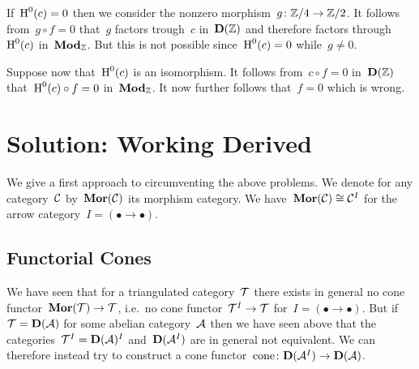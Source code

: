 \documentclass[a4paper,10pt]{scrartcl}
\begin{document}
If~$\operatorname{H}^0(c) = 0$ then we consider the nonzero morphism~$g \colon \mathbb{Z}/4 \to \mathbb{Z}/2$.
It follows from~$g \circ f = 0$ that~$g$ factors trough~$c$ in~$\mathbf{D}(\mathbb{Z})$ and therefore factors through~$\operatorname{H}^0(c)$ in~$\mathbf{Mod}_{\mathbb{Z}}$.
But this is not possible since~$\operatorname{H}^0(c) = 0$ while~$g \neq 0$.

Suppose now that~$\operatorname{H}^0(c)$ is an isomorphism.
It follows from~$c \circ f = 0$ in~$\mathbf{D}(\mathbb{Z})$ that~$\operatorname{H}^0(c) \circ f = 0$ in~$\mathbf{Mod}_{\mathbb{Z}}$.
It now further follows that~$f = 0$ which is wrong.





\section{Solution: Working Derived}

We give a first approach to circumventing the above problems.
We denote for any category~$\mathcal{C}$ by~$\mathbf{Mor}(\mathcal{C})$ its morphism category.
We have~$\mathbf{Mor}(\mathcal{C}) \cong \mathcal{C}^I$ for the arrow category~$I = (\bullet \to \bullet)$.



\subsection{Functorial Cones}

We have seen that for a triangulated category~$\mathcal{T}$ there exists in general no cone functor~$\mathbf{Mor}(\mathcal{T}) \to \mathcal{T}$, i.e.\ no cone functor~$\mathcal{T}^I \to \mathcal{T}$ for~$I = (\bullet \to \bullet)$.
But if~$\mathcal{T} = \mathbf{D}(\mathcal{A})$ for some abelian category~$\mathcal{A}$ then we have seen above that the categories~$\mathcal{T}^I = \mathbf{D}(\mathcal{A})^I$ and~$\mathbf{D}(\mathcal{A}^I)$ are in general not equivalent.
We can therefore instead try to construct a cone functor~$\operatorname{cone} \colon \mathbf{D}(\mathcal{A}^I) \to \mathbf{D}(\mathcal{A})$.
\end{document}
